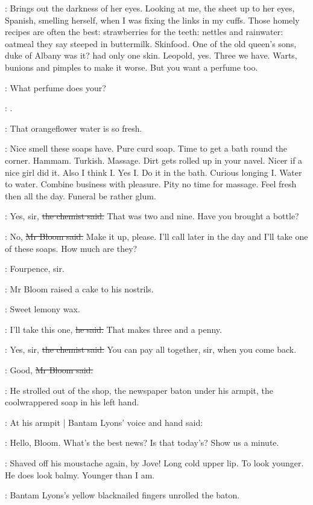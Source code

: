 \BloomInt:
Brings out the darkness of her eyes.
Looking at me,
the sheet up to her eyes,
Spanish,
smelling herself,
when I was fixing the links in my cuffs.
Those homely recipes are often the best:
strawberries for the teeth:
nettles and rainwater:
oatmeal they say steeped in buttermilk.
Skinfood.
One of the old queen's sons,
duke of Albany was it?
had only one skin.
Leopold, yes.
Three we have.
Warts, bunions and pimples to make it worse.
But you want a perfume too.

\martha:
What perfume does your?

\BloomInt:
.

\Molly:
That orangeflower water is so fresh.

\BloomInt:
Nice smell these soaps have.
Pure curd soap.
Time to get a bath round the corner.
Hammam.
Turkish.
Massage.
Dirt gets rolled up in your navel.
Nicer if a nice girl did it.
Also I think I.
Yes I.
Do it in the bath.
Curious longing I.
Water to water.
Combine business with pleasure.
Pity no time for massage.
Feel fresh then all the day.
Funeral be rather glum.

\sweny:
Yes, sir,
\sout{the chemist said.}
That was two and nine.
Have you brought a bottle?

\Bloom:
No,
\sout{Mr Bloom said.}
Make it up, please.
I'll call later in the day
and I'll take one of these soaps.
How much are they?

\sweny:
Fourpence, sir.

:
Mr Bloom raised a cake to his nostrils.

\BloomInt:
Sweet lemony wax.

\Bloom:
I'll take this one,
\sout{he said.}
That makes three and a penny.

\sweny:
Yes, sir,
\sout{the chemist said.}
You can pay all together, sir, when you come back.

\Bloom:
Good,
\sout{Mr Bloom said.}

:
He strolled out of the shop,
the newspaper baton under his armpit,
the coolwrappered soap in his left hand.

:
At his armpit |
Bantam Lyons' voice and hand said:

\lyons:
Hello, Bloom.
What's the best news?
Is that today's?
Show us a minute.

\BloomInt:
Shaved off his moustache again, by Jove!
Long cold upper lip.
To look younger.
He does look balmy.
Younger than I am.

:
Bantam Lyons's yellow blacknailed fingers unrolled the baton.


